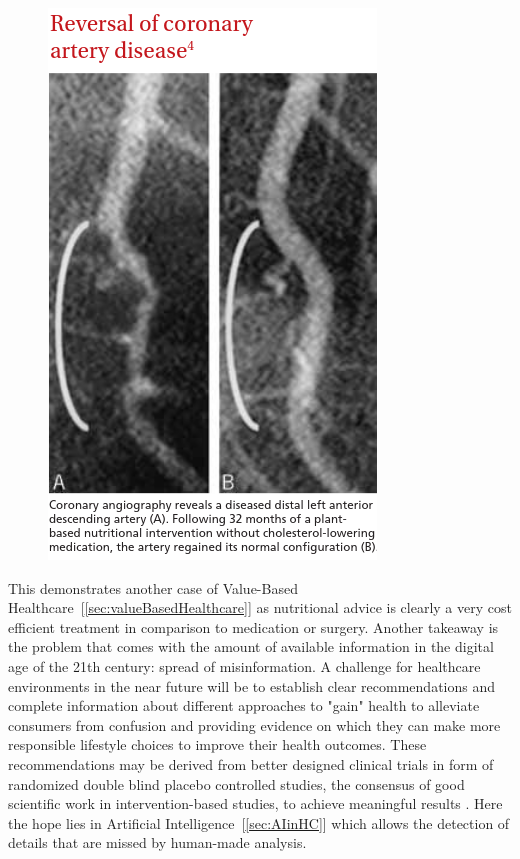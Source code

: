 \begin{figure}[htpb]
    \centering
    \includegraphics[width=0.8\linewidth]{media/Screenshot_2020-01-07_JFP_06307_Article1 pdf.png}
    \caption{\cite{esselstyn2014way}}%
    \label{fig:reverseCAD}
\end{figure}
This demonstrates another case of Value-Based Healthcare~[\ref{sec:valueBasedHealthcare}] as nutritional advice is clearly a very cost efficient treatment in comparison to medication or surgery. Another takeaway is the problem that comes with the amount of available information in the digital age of the 21th century: spread of misinformation. A challenge for healthcare environments in the near future will be to establish clear recommendations and complete information about different approaches to "gain" health to alleviate consumers from confusion and providing evidence on which they can make more responsible lifestyle choices to improve their health outcomes. These recommendations may be derived from better designed clinical trials in form of randomized double blind placebo controlled studies, the consensus of good scientific work in intervention-based studies, to achieve meaningful results \cite{misra2012randomized}. Here the hope lies in Artificial Intelligence~[\ref{sec:AIinHC}] which allows the detection of details that are missed by human-made analysis.
